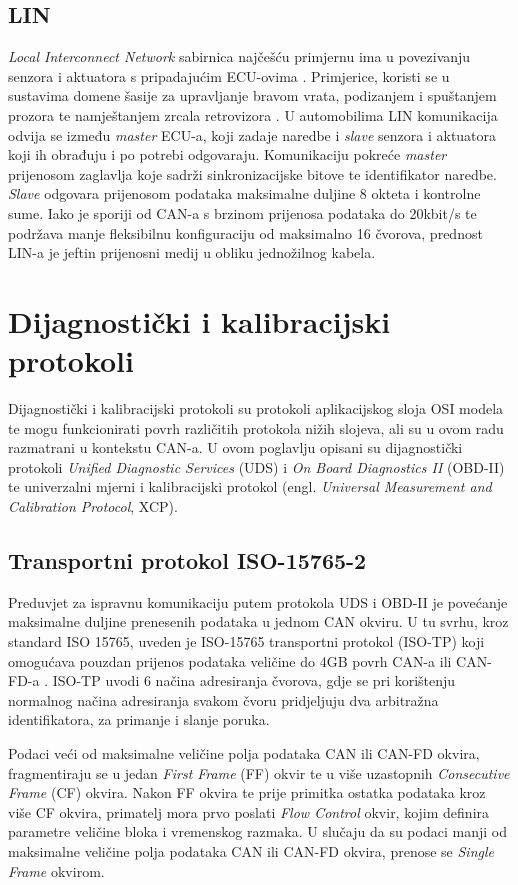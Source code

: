 \documentclass[times, utf8, diplomski, numeric]{fer}
\begin{document}
\subsection{LIN}
\textit{Local Interconnect Network} sabirnica najčešću primjernu ima u povezivanju senzora i aktuatora s pripadajućim ECU-ovima . Primjerice, koristi se u sustavima domene šasije za upravljanje bravom vrata, podizanjem i spuštanjem prozora te namještanjem zrcala retrovizora \cite{bosch2022handbook, nasser2023automotive, dissecto2023networks}. U automobilima LIN komunikacija odvija se između \textit{master} ECU-a, koji zadaje naredbe i \textit{slave} senzora i aktuatora koji ih obrađuju i po potrebi odgovaraju. Komunikaciju pokreće \textit{master} prijenosom zaglavlja koje sadrži sinkronizacijske bitove te identifikator naredbe. \textit{Slave} odgovara prijenosom podataka maksimalne duljine 8 okteta i kontrolne sume. Iako je sporiji od CAN-a s brzinom prijenosa podataka do 20kbit/s te podržava manje fleksibilnu konfiguraciju od maksimalno 16 čvorova, prednost LIN-a je jeftin prijenosni medij u obliku jednožilnog kabela.
\section{Dijagnostički i kalibracijski protokoli}
 Dijagnostički i kalibracijski protokoli su protokoli aplikacijskog sloja OSI modela te mogu funkcionirati povrh različitih protokola nižih slojeva, ali su u ovom radu razmatrani u kontekstu CAN-a. U ovom poglavlju opisani su dijagnostički protokoli \textit{Unified Diagnostic Services} (UDS) i \textit{On Board Diagnostics II} (OBD-II) te univerzalni mjerni i kalibracijski protokol (engl. \textit{Universal Measurement and Calibration Protocol}, XCP). 
 
\subsection{Transportni protokol ISO-15765-2}
Preduvjet za ispravnu komunikaciju putem protokola UDS i OBD-II je povećanje maksimalne duljine prenesenih podataka u jednom CAN okviru. U tu svrhu, kroz standard ISO 15765, uveden je ISO-15765 transportni protokol (ISO-TP) koji omogućava pouzdan prijenos podataka veličine do 4GB povrh CAN-a ili CAN-FD-a \cite{dissecto2023isotp}. ISO-TP uvodi 6 načina adresiranja čvorova, gdje se pri korištenju normalnog načina adresiranja svakom čvoru pridjeljuju dva arbitražna identifikatora, za primanje i slanje poruka.

Podaci veći od maksimalne veličine polja podataka CAN ili CAN-FD okvira, fragmentiraju se u jedan \textit{First Frame} (FF) okvir te u više uzastopnih \textit{Consecutive Frame} (CF) okvira. Nakon FF okvira te prije primitka ostatka podataka kroz više CF okvira, primatelj mora prvo poslati \textit{Flow Control} okvir, kojim definira parametre veličine bloka i vremenskog razmaka. U slučaju da su podaci manji od maksimalne veličine polja podataka CAN ili CAN-FD okvira, prenose se \textit{Single Frame} okvirom.  
\end{document}
